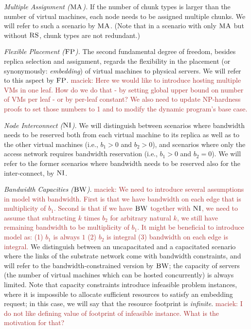 \documentclass[9pt]{sigcomm-alternate}
\newcommand{\maciek}[1]{\textcolor{brown}{maciek: #1}}
\newcommand{\CC}{\textsc{NI}}
\newcommand{\FP}{\textsc{FP}}
\newcommand{\RS}{\textsc{RS}}
\newcommand{\BW}{\textsc{BW}}
\newcommand{\MA}{\textsc{MA}}
\newcommand{\CostTrans}{\ensuremath{b_1}}
\newcommand{\CostCom}{\ensuremath{b_2}}
\begin{document}
\emph{Multiple Assignment ($\MA$).}
If the number of chunk types is larger than the number of virtual machines,
each node needs to be assigned multiple chunks. We will refer to such a scenario by $\MA$.
(Note that in a scenario with only $\MA$ but without $\RS$, chunk types are not redundant.)

\emph{Flexible Placement ($\FP$).} The second fundamental degree of freedom, besides replica selection and assignment,
regards the flexibility in the placement (or synonymously: \emph{embedding}) of virtual machines to physical servers.
We will refer to this aspect by $\FP$. \maciek{Here we would like to
  introduce hosting multiple VMs in one leaf. How do we do that - by
  setting global upper bound on number of VMs per leaf - or by
  per-leaf constant? We also need to update NP-hardness proofs to set
  those numbers to 1 and to modify the dynamic program's base case.}

\emph{Node Interconnect ($\CC$).} We will distinguish between scenarios where bandwidth needs to be reserved
both from each virtual machine to its replica as well as to the other virtual machines
(i.e., $\CostTrans>0$ and $\CostCom>0$), and
 scenarios where only the access network requires bandwidth reservation (i.e., $\CostTrans>0$ and $\CostCom=0$).
 We will refer to the former scenarios
where bandwidth needs to be reserved also for the inter-connect, by $\CC$.

\emph{Bandwidth Capacities ($\BW$).} 
\maciek{We need to introduce several assumptions in model with
  bandwidth. First is that we have bandwidth on each edge that is
  multiplicity of $\CostTrans$. Second is that if we have $\BW$ together with
$\CC$, we need to assume that subtracting $k$ times $\CostCom$ for
arbitrary natural $k$, we still have remaining bandwidth to be
multiplicity of $\CostTrans$. It might be beneficial to introduce
model as: (1) $\CostTrans$ is always $1$ (2) $\CostCom$ is integral
(3) bandwidth on each edge is integral.}
We distinguish between an uncapacitated and a capacitated scenario where the links
of the substrate network come with bandwidth
constraints, and will refer to the bandwidth-constrained version by $\BW$; the capacity of servers
(the number of virtual machines which can be hosted concurrently) is always limited.
Note that capacity constraints introduce infeasible problem instances, where it is impossible to
allocate sufficient resources to satisfy an embedding request; in this case, we will say that the
resource footprint is \emph{infinite}. \maciek{I do not like defining
  value of footprint of infeasible instance. What is the motivation
  for that?}
\end{document}
